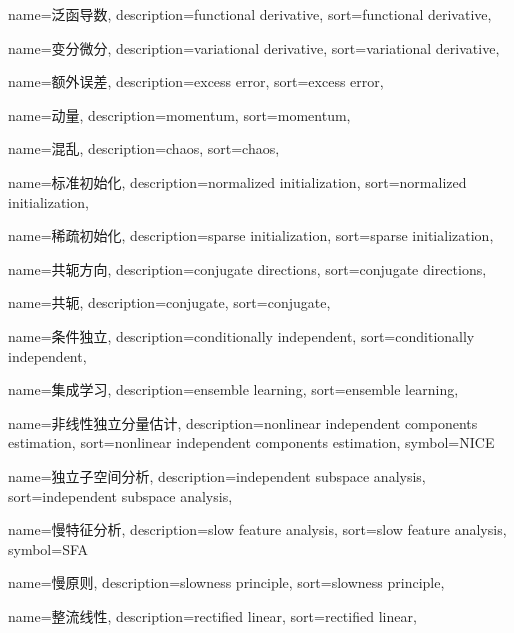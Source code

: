 {
  name=泛函导数,
  description={functional derivative},
  sort={functional derivative},
}

{
  name=变分微分,
  description={variational derivative},
  sort={variational derivative},
}

{
  name=额外误差,
  description={excess error},
  sort={excess error},
}

{
  name=动量,
  description={momentum},
  sort={momentum},
}

{
  name=混乱,
  description={chaos},
  sort={chaos},
}

{
  name=标准初始化,
  description={normalized initialization},
  sort={normalized initialization},
}

{
  name=稀疏初始化,
  description={sparse initialization},
  sort={sparse initialization},
}

{
  name=共轭方向,
  description={conjugate directions},
  sort={conjugate directions},
}

{
  name=共轭,
  description={conjugate},
  sort={conjugate},
}

{
  name=条件独立,
  description={conditionally independent},
  sort={conditionally independent},
}

{
  name=集成学习,
  description={ensemble learning},
  sort={ensemble learning},
}

{
  name=非线性独立分量估计,
  description={nonlinear independent components estimation},
  sort={nonlinear independent components estimation},
  symbol={NICE}
}

{
  name=独立子空间分析,
  description={independent subspace analysis},
  sort={independent subspace analysis},
}

{
  name=慢特征分析,
  description={slow feature analysis},
  sort={slow feature analysis},
  symbol={SFA}
}

{
  name=慢原则,
  description={slowness principle},
  sort={slowness principle},
}

{
  name=整流线性,
  description={rectified linear},
  sort={rectified linear},
}

